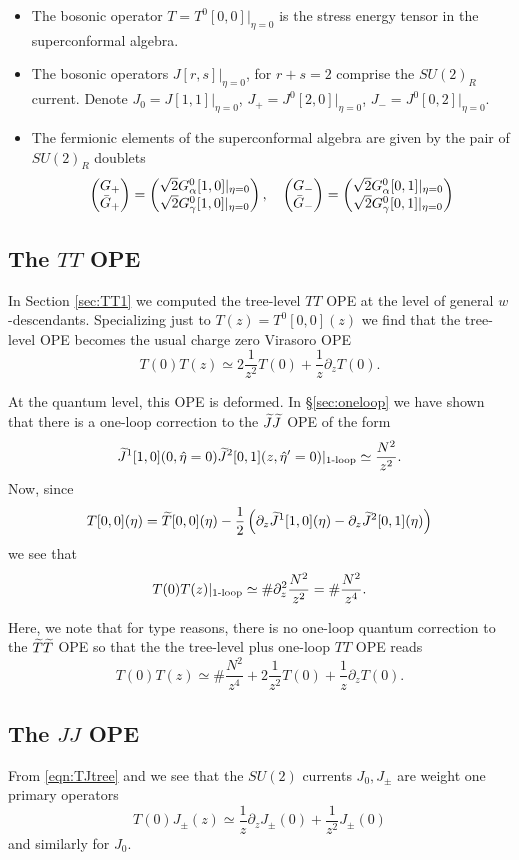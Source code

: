 \documentclass[../main.tex]{subfiles}
\begin{document}
\begin{itemize}
\item The bosonic operator $T = T^0 [0,0]|_{\eta = 0}$ is the stress energy tensor in the superconformal algebra. 
\item The bosonic operators $J [r,s]|_{\eta = 0}$, for $r + s = 2$ comprise the $SU(2)_R$ current.
Denote $J_0 = J [1,1]|_{\eta = 0}$, $J_+ = J^0 [2,0]|_{\eta = 0}$, $J_- = J^0[0,2]|_{\eta = 0}$. 
\item The fermionic elements of the superconformal algebra are given by the pair of $SU(2)_R$ doublets 
\[
\begin{pmatrix} G_+ \\ \Bar{G}_+ \end{pmatrix} = \begin{pmatrix} \sqrt{2} G^0_\alpha [1,0]|_{\eta = 0} \\ \sqrt{2} G^0_\gamma [1,0]|_{\eta = 0} \end{pmatrix} , \quad \begin{pmatrix} G_- \\ \Bar{G}_- \end{pmatrix} = \begin{pmatrix} \sqrt{2} G^0_\alpha [0,1]|_{\eta = 0} \\ \sqrt{2} G^0_\gamma [0,1]|_{\eta = 0} \end{pmatrix}
\]
\end{itemize}


\subsection{The $TT$ OPE}

In Section \ref{sec:TT1} we computed the tree-level $TT$ OPE at the level of general $w$-descendants.
Specializing just to $T (z) = T^0[0,0](z)$ we find that the tree-level OPE becomes the usual charge zero Virasoro OPE
\[
T(0) T(z) \simeq 2 \frac{1}{z^2} T(0) + \frac{1}{z} \partial_z T(0) .
\]

At the quantum level, this OPE is deformed. 
In \S \ref{sec:oneloop} we have shown that there is a one-loop correction to the $\widetilde J \widetilde J$ OPE of the form 
\[
\widetilde J^{1}[1,0] (0, \Hat\eta = 0) \widetilde J^{2} [0,1] (z, \Hat\eta'=0) |_{\text{1-loop}} \simeq \frac{N^2}{z^2} .
\]
Now, since 
\[
T[0,0] (\eta) = \widetilde T[0,0] (\eta) - \frac12 \left(\partial_z \widetilde J^{1}[1,0] (\eta) - \partial_z \widetilde J^{2}[0,1] (\eta) \right) 
\]
we see that 
\[
T(0) T(z)|_{\text{1-loop}} \simeq \# \partial_z^2 \frac{N^2}{z^2} = \# \frac{N^2}{z^4} .
\]

Here, we note that for type reasons, there is no one-loop quantum correction to the $\widetilde T \widetilde T$ OPE so that the the tree-level plus one-loop $TT$ OPE reads
\[
T(0) T(z) \simeq \# \frac{N^2}{z^4} + 2 \frac{1}{z^2} T(0) + \frac{1}{z} \partial_z T(0) .
\]


\subsection{The $JJ$ OPE } 

From \eqref{eqn:TJtree} and we see that the $SU(2)$ currents $J_0, J_\pm$ are weight one primary operators
\[
T(0) J_\pm (z) \simeq \frac1z \partial_z J_\pm (0) + \frac{1}{z^2} J_\pm (0) 
\]
and similarly for $J_0$. 
\end{document}
